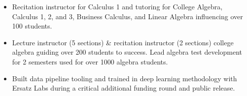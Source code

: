 \documentclass[10pt,a4paper,ragged2e]{altacv}
\begin{document}
\divider


\begin{itemize}
\item Recitation instructor for Calculus 1 and tutoring for College Algebra, Calculus 1, 2, and 3, Business Calculus, and Linear Algebra influencing over 100 students.
\end{itemize}

\divider


\begin{itemize}
\item Lecture instructor (5 sections) {\&} recitation instructor (2 sections) college algebra guiding over 200 students to success. Lead algebra test development for 2 semesters used for over 1000 algebra students.
\end{itemize}
\divider


\begin{itemize}
\item Built data pipeline tooling and trained in deep learning methodology with Ersatz Labs during a critical additional funding round and public release.
\end{itemize}




\end{document}
